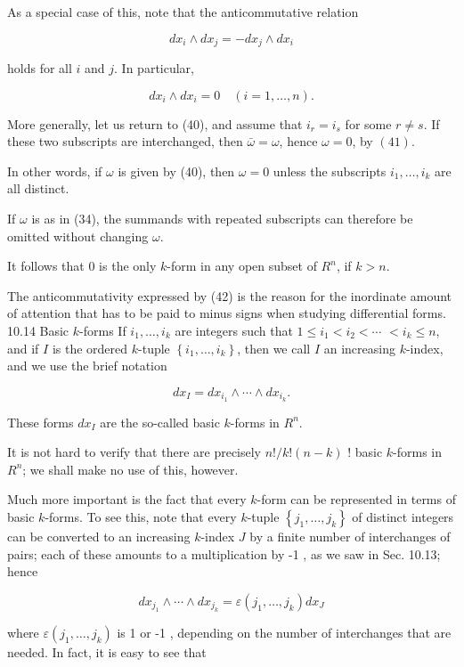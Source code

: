 \documentclass[10pt]{article}
\begin{document}
As a special case of this, note that the anticommutative relation

$$
d x_{i} \wedge d x_{j}=-d x_{j} \wedge d x_{i}
$$

holds for all $i$ and $j$. In particular,

$$
d x_{i} \wedge d x_{i}=0 \quad(i=1, \ldots, n) .
$$

More generally, let us return to (40), and assume that $i_{r}=i_{s}$ for some $r \neq s$. If these two subscripts are interchanged, then $\bar{\omega}=\omega$, hence $\omega=0$, by $(41)$.

In other words, if $\omega$ is given by (40), then $\omega=0$ unless the subscripts $i_{1}, \ldots, i_{k}$ are all distinct.

If $\omega$ is as in (34), the summands with repeated subscripts can therefore be omitted without changing $\omega$.

It follows that 0 is the only $k$-form in any open subset of $R^{n}$, if $k>n$.

The anticommutativity expressed by (42) is the reason for the inordinate amount of attention that has to be paid to minus signs when studying differential forms. 10.14 Basic $k$-forms If $i_{1}, \ldots, i_{k}$ are integers such that $1 \leq i_{1}<i_{2}<\cdots$ $<i_{k} \leq n$, and if $I$ is the ordered $k$-tuple $\left\{i_{1}, \ldots, i_{k}\right\}$, then we call $I$ an increasing $k$-index, and we use the brief notation

$$
d x_{I}=d x_{i_{1}} \wedge \cdots \wedge d x_{i_{k}} .
$$

These forms $d x_{I}$ are the so-called basic $k$-forms in $R^{n}$.

It is not hard to verify that there are precisely $n ! / k !(n-k)$ ! basic $k$-forms in $R^{n}$; we shall make no use of this, however.

Much more important is the fact that every $k$-form can be represented in terms of basic $k$-forms. To see this, note that every $k$-tuple $\left\{j_{1}, \ldots, j_{k}\right\}$ of distinct integers can be converted to an increasing $k$-index $J$ by a finite number of interchanges of pairs; each of these amounts to a multiplication by -1 , as we saw in Sec. 10.13; hence

$$
d x_{j_{1}} \wedge \cdots \wedge d x_{j_{k}}=\varepsilon\left(j_{1}, \ldots, j_{k}\right) d x_{J}
$$

where $\varepsilon\left(j_{1}, \ldots, j_{k}\right)$ is 1 or -1 , depending on the number of interchanges that are needed. In fact, it is easy to see that
\end{document}
